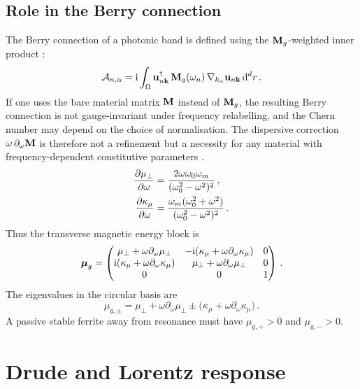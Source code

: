 \subsection{Role in the Berry connection}
\label{sec:appD-Mg-berry}

The Berry connection of a photonic band is defined using the
$\mathbf{M}_g$-weighted inner product \cite{gangaraj2016berry}:
\begin{equation}\label{eq:appD-berry-Mg}
  \mathcal{A}_{n,\alpha}
  = \mathrm{i}\int_\Omega
  \mathbf{u}_{n\mathbf{k}}^\dagger\,\mathbf{M}_g(\omega_n)\,
  \nabla_{k_\alpha}\mathbf{u}_{n\mathbf{k}}\,\mathrm{d}^d r\,.
\end{equation}
If one uses the bare material matrix $\mathbf{M}$ instead of $\mathbf{M}_g$, the
resulting Berry connection is not gauge-invariant under frequency
relabelling, and the Chern number may depend on the choice of
normalisation.  The dispersive correction $\omega\,\partial_\omega\mathbf{M}$
is therefore not a refinement but a necessity for any material with
frequency-dependent constitutive parameters \cite{silveirinha2016bulk}.
\begin{align}\label{eq:appD-polder-derivatives}
  \frac{\partial \mu_\perp}{\partial \omega}
  &=\frac{2\omega\omega_0\omega_m}{(\omega_0^2-\omega^2)^2}\,,\\
  \frac{\partial \kappa_\mu}{\partial \omega}
  &=\frac{\omega_m(\omega_0^2+\omega^2)}{(\omega_0^2-\omega^2)^2}\,.
\end{align}
Thus the transverse magnetic energy block is
\begin{equation}\label{eq:appD-Mg-polder}
  \boldsymbol{\mu}_g=\begin{pmatrix}
    \mu_\perp+\omega\partial_\omega\mu_\perp &
      -\mathrm{i}(\kappa_\mu+\omega\partial_\omega\kappa_\mu)&0\\
    \mathrm{i}(\kappa_\mu+\omega\partial_\omega\kappa_\mu)&
      \mu_\perp+\omega\partial_\omega\mu_\perp&0\\
    0&0&1
  \end{pmatrix}\,.
\end{equation}
The eigenvalues in the circular basis are
\begin{equation}\label{eq:appD-Mg-circular}
  \mu_{g,\pm}=\mu_\perp+\omega\partial_\omega\mu_\perp
  \pm\bigl(\kappa_\mu+\omega\partial_\omega\kappa_\mu\bigr)\,.
\end{equation}
A passive stable ferrite away from resonance must have
$\mu_{g,+}>0$ and $\mu_{g,-}>0$.

\section{Drude and Lorentz response}
\label{sec:appD-drude-lorentz}

